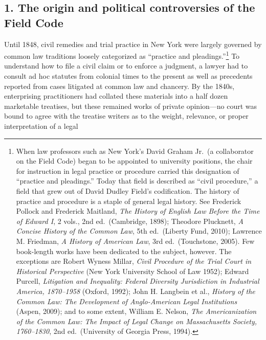 \documentclass[12pt,]{article}
\let\rmarkdownfootnote\footnote%
\def\footnote{\protect\rmarkdownfootnote}
\begin{document}
\hypertarget{the-origin-and-political-controversies-of-the-field-code}{%
\subsection{1. The origin and political controversies of the Field
Code}\label{the-origin-and-political-controversies-of-the-field-code}}

Until 1848, civil remedies and trial practice in New York were largely
governed by common law traditions loosely categorized as ``practice and
pleadings.''\footnote{When law professors such as New York's David
  Graham Jr.~(a collaborator on the Field Code) began to be appointed to
  university positions, the chair for instruction in legal practice or
  procedure carried this designation of ``practice and pleadings.''
  Today that field is described as ``civil procedure,'' a field that
  grew out of David Dudley Field's codification. The history of practice
  and procedure is a staple of general legal history. See Frederick
  Pollock and Frederick Maitland, \emph{The History of English Law
  Before the Time of Edward I}, 2 vols., 2nd ed.~(Cambridge, 1898);
  Theodore Plucknett, \emph{A Concise History of the Common Law}, 5th
  ed.~(Liberty Fund, 2010); Lawrence M. Friedman, \emph{A History of
  American Law}, 3rd ed.~(Touchstone, 2005). Few book-length works have
  been dedicated to the subject, however. The exceptions are Robert
  Wyness Millar, \emph{Civil Procedure of the Trial Court in Historical
  Perspective} (New York University School of Law 1952); Edward Purcell,
  \emph{Litigation and Inequality: Federal Diversity Jurisdiction in
  Industrial America, 1870--1958} (Oxford, 1992); John H. Langbein et
  al., \emph{History of the Common Law: The Development of
  Anglo-American Legal Institutions} (Aspen, 2009); and to some extent,
  William E. Nelson, \emph{The Americanization of the Common Law: The
  Impact of Legal Change on Massachusetts Society, 1760--1830}, 2nd
  ed.~(University of Georgia Press, 1994).} To understand how to file a
civil claim or to enforce a judgment, a lawyer had to consult ad hoc
statutes from colonial times to the present as well as precedents
reported from cases litigated at common law and chancery. By the 1840s,
enterprising practitioners had collated these materials into a half
dozen marketable treatises, but these remained works of private
opinion---no court was bound to agree with the treatise writers as to
the weight, relevance, or proper interpretation of a legal
\end{document}
